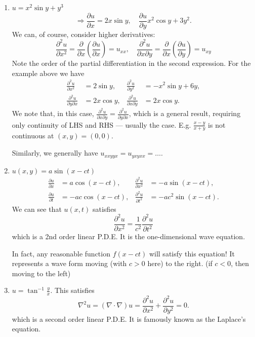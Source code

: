 \documentclass[12pt]{report}
\theoremstyle{definition}
\begin{document}
\begin{enumerate}[label = (\roman*)]
    \item $u = x^{2}\sin{y} + y^{3}$\[
        \Rightarrow{}\frac{\partial u}{\partial x} = 2x\sin{y},\quad
        \frac{\partial u}{\partial y} x^{2}\cos{y} + 3y^{2}.
    \]
    We can, of course, consider higher derivatives:\[
        \frac{\partial^{2}u}{\partial x^{2}} 
        = \frac{\partial }{\partial x} \left(\frac{\partial u}{\partial x} \right) 
        = u_{xx}, \quad
        \frac{\partial^{2}u}{\partial x \partial y} 
        = \frac{\partial}{\partial x} \left(\frac{\partial u}{\partial y} \right) 
        = u_{xy}
    \]
    Note the order of the partial differentiation in the second expression.
    For the example above we have\[
        \begin{align*}
            \frac{\partial^{2}u}{\partial x^{2}} & = 2\sin{y}, & \frac{\partial^{2}u}{\partial y^{2}} & = -x^{2}\sin{y} + 6y, \\ 
            \frac{\partial^{2}u}{\partial y \partial x} & = 2x\cos{y}, & \frac{\partial^{2}u}{\partial x \partial y} & = 2x\cos{y}.
        \end{align*}
    \]
    We note that, in this case, $\frac{\partial^{2}u}{\partial x \partial y}
    = \frac{\partial^{2}u}{\partial y \partial x} $, which is a general result,
    requiring only continuity of LHS and RHS --- usually the case.
    E.g. $\frac{x-y}{x+y}$ is not continuous at $(x,y) = (0,0)$.

    Similarly, we generally have $u_{xxyyx} = u_{yxyxx} = \ldots$.

\item $u(x,y) = a\sin{(x - ct)}$\[
    \begin{align*}
        \frac{\partial u}{\partial x} & = a\cos{(x-ct)}, & \frac{\partial^{2}u}{\partial x^{2}} & = -a\sin{(x-ct)}, \\
        \frac{\partial u}{\partial t} & = -ac\cos{(x-ct)}, & \frac{\partial^{2}u}{\partial t^{2}} & = -ac^{2}\sin{(x-ct)}.
    \end{align*}
\]
We can see that $u(x,t)$ satisfies\[
    \frac{\partial^{2}u}{\partial x^{2}} = \frac{1}{c^{2}} \frac{\partial^{2}u}{\partial t^{2}} 
\]which is a 2nd order linear P.D.E.
It is the one-dimensional wave equation.

In fact, any reasonable function $f(x-ct)$ will satisfy this equation!
It represents a wave form moving (with $c>0$ here) to the right.
(if $c<0$, then moving to the left)

\item $u = \tan^{-1}{\frac{y}{x}}$.
    This satisfies\[
        \nabla^{2} u = (\nabla\cdot\nabla) u
        = \frac{\partial^{2}u}{\partial x^{2}} + \frac{\partial^{2}u}{\partial y^{2}} = 0.
    \]which is a second order linear P.D.E.
    It is famously known as the Laplace's equation.
\end{enumerate}
\end{document}
